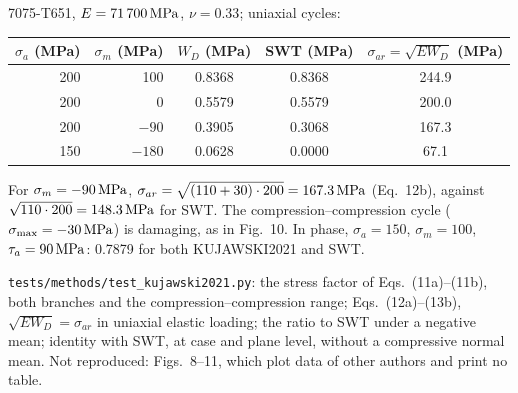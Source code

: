 7075-T651, $E=71\,700\,\mathrm{MPa}$, $\nu=0.33$; uniaxial cycles:
\begin{center}\small
\begin{tabular}{@{}rrccc@{}}
\toprule
$\sigma_a$ (MPa) & $\sigma_m$ (MPa) & $W_D$ (MPa) & SWT (MPa) & $\sigma_{ar}=\sqrt{EW_D}$ (MPa)\\\midrule
200 & 100 & 0.8368 & 0.8368 & 244.9\\
200 & 0 & 0.5579 & 0.5579 & 200.0\\
200 & $-90$ & 0.3905 & 0.3068 & 167.3\\
150 & $-180$ & 0.0628 & 0.0000 & 67.1\\
\bottomrule
\end{tabular}
\end{center}
For $\sigma_m=-90\,\mathrm{MPa}$, $\sigma_{ar}=\sqrt{(110+30)\cdot200}=167.3\,\mathrm{MPa}$ (Eq.~12b), against
$\sqrt{110\cdot200}=148.3\,\mathrm{MPa}$ for SWT. The compression--compression cycle ($\sigma_{\max}=-30\,\mathrm{MPa}$)
is damaging, as in Fig.~10. In phase, $\sigma_a=150$, $\sigma_m=100$, $\tau_a=90\,\mathrm{MPa}$: 0.7879 for
both KUJAWSKI2021 and SWT.

 \texttt{tests/methods/test\_kujawski2021.py}: the stress factor of
Eqs.~(11a)--(11b), both branches and the compression--compression range; Eqs.~(12a)--(13b),
$\sqrt{EW_D}=\sigma_{ar}$ in uniaxial elastic loading; the ratio to SWT under a negative mean;
identity with SWT, at case and plane level, without a compressive normal mean. Not reproduced:
Figs.~8--11, which plot data of other authors and print no table.
